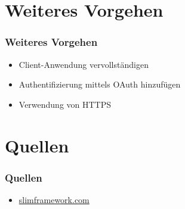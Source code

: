 \section{Weiteres Vorgehen}
\begin{frame}
	\frametitle*{Weiteres Vorgehen}
	\begin{itemize}
		\item Client-Anwendung vervollständigen
		\item Authentifizierung mittels OAuth hinzufügen
		\item Verwendung von HTTPS
	\end{itemize}
\end{frame}

\section{Quellen}
\begin{frame}
	\frametitle*{Quellen}
	\begin{itemize}
		\item \url{slimframework.com}
	\end{itemize}
\end{frame}
